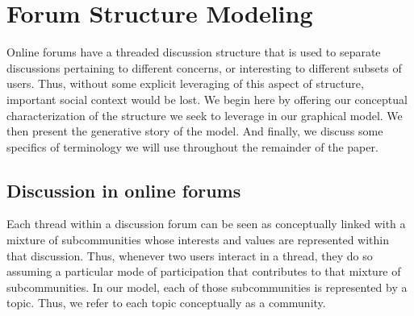 \documentclass{sig-alternate}
\begin{document}
\section{Forum Structure Modeling}
\label{sec:approach}
Online forums have a threaded discussion structure that is used to separate discussions pertaining to different concerns, or interesting to different subsets of users.  Thus, without some explicit leveraging of this aspect of structure, important social context would be lost.  We begin here by offering our conceptual characterization of the structure we seek to leverage in our graphical model.  We then present the generative story of the model.  And finally, we discuss some specifics of terminology we will use throughout the remainder of the paper.

\subsection{Discussion in online forums}
Each thread within a discussion forum can be seen as conceptually linked with a mixture of subcommunities whose interests and values are represented within that discussion.  Thus, whenever two users interact in a thread, they do so assuming a particular mode of participation that contributes to that mixture of subcommunities.  In our model, each of those subcommunities is represented by a topic.  Thus, we refer to each topic  conceptually as a community.
\end{document}
